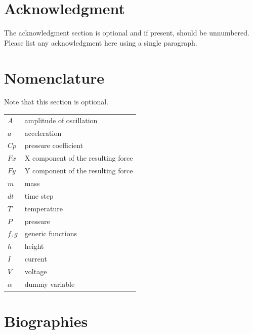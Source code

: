 \documentclass[IJPHM, 2014, 00]{PHMSociety}
\begin{document}
\section*{Acknowledgment}
The acknowledgment section is optional and if present, should be unnumbered. Please list any acknowledgment here using a single paragraph.




\section*{Nomenclature}
Note that this section is optional.

\begin{tabular}{ l  l }
	$A$			&amplitude of oscillation\\ 
	$a$			&acceleration\\ 
	$Cp$		&pressure coefficient\\ 
	$Fx$			&X component of the resulting force\\  
	$Fy$			&Y component of the resulting force\\ 
	$m$			&mass\\ 
	$dt$			&time step\\ 
	$T$  	   		&temperature \\ 
	$P$	   		&pressure \\ 
	$f, g$      		&generic functions\\ 
	$h$	   		&height\\ 
	    $I$   	   	&current\\ 
	$V$	   		&voltage\\ 
	$\alpha$      	&dummy variable\\ 
 \end{tabular}








\section*{Biographies}
\end{document}
